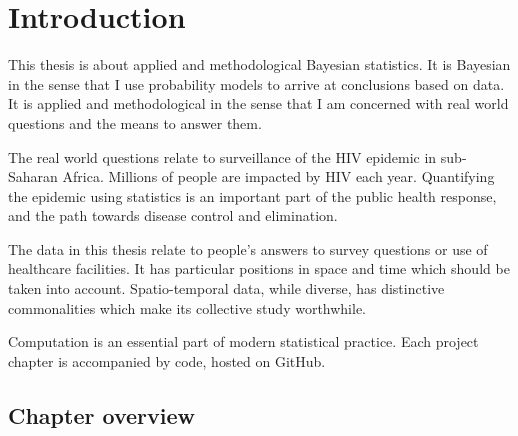 \documentclass[a4paper, nobind]{templates/ociamthesis}
\begin{document}
\flushbottom

\hypertarget{introduction}{%
\chapter{Introduction}\label{introduction}}

\adjustmtc
{}

This thesis is about applied and methodological Bayesian statistics.
It is Bayesian in the sense that I use probability models to arrive at conclusions based on data.
It is applied and methodological in the sense that I am concerned with real world questions and the means to answer them.

The real world questions relate to surveillance of the HIV epidemic in sub-Saharan Africa.
Millions of people are impacted by HIV each year.
Quantifying the epidemic using statistics is an important part of the public health response, and the path towards disease control and elimination.

The data in this thesis relate to people's answers to survey questions or use of healthcare facilities.
It has particular positions in space and time which should be taken into account.
Spatio-temporal data, while diverse, has distinctive commonalities which make its collective study worthwhile.

Computation is an essential part of modern statistical practice.
Each project chapter is accompanied by code, hosted on GitHub.

\hypertarget{chapter-overview}{%
\section{Chapter overview}\label{chapter-overview}}
\end{document}

